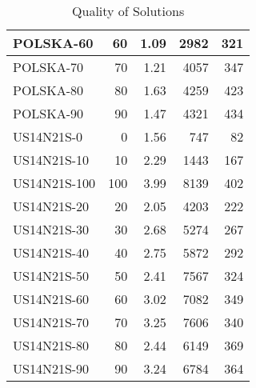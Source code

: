 \begin{table}[h]
\begin{tabular}{|l|r|r|r|r|}
\hline POLSKA-60    & 60  & 1.09 & 2982 & 321 \\
\hline POLSKA-70    & 70  & 1.21 & 4057 & 347 \\
\hline POLSKA-80    & 80  & 1.63 & 4259 & 423 \\
\hline POLSKA-90    & 90  & 1.47 & 4321 & 434 \\
\hline US14N21S-0   & 0   & 1.56 & 747  & 82  \\
\hline US14N21S-10  & 10  & 2.29 & 1443 & 167 \\
\hline US14N21S-100 & 100 & 3.99 & 8139 & 402 \\
\hline US14N21S-20  & 20  & 2.05 & 4203 & 222 \\
\hline US14N21S-30  & 30  & 2.68 & 5274 & 267 \\
\hline US14N21S-40  & 40  & 2.75 & 5872 & 292 \\
\hline US14N21S-50  & 50  & 2.41 & 7567 & 324 \\
\hline US14N21S-60  & 60  & 3.02 & 7082 & 349 \\
\hline US14N21S-70  & 70  & 3.25 & 7606 & 340 \\
\hline US14N21S-80  & 80  & 2.44 & 6149 & 369 \\
\hline US14N21S-90  & 90  & 3.24 & 6784 & 364 \\
\bottomrule
\end{tabular}
\caption{Quality of Solutions}
\label{tab:quality}
\end{table}
